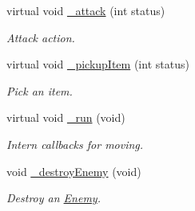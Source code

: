 \begin{DoxyCompactItemize}
virtual void \hyperlink{class_characters_a9ff6c76cd02e53019e15801e9c76a719}{\+\_\+attack} (int status)
\begin{DoxyCompactList}\small\item\em Attack action. \end{DoxyCompactList}\item 
virtual void \hyperlink{class_characters_aee824830a67177342ae606f959fb0c7a}{\+\_\+pickup\+Item} (int status)
\begin{DoxyCompactList}\small\item\em Pick an item. \end{DoxyCompactList}\item 
virtual void \hyperlink{class_characters_aa59e298bef3e58fc7c82deb86e762200}{\+\_\+run} (void)
\begin{DoxyCompactList}\small\item\em Intern callbacks for moving. \end{DoxyCompactList}\item 
void \hyperlink{class_characters_a98666bfdc74679e0ab605a4f6a89ecb2}{\+\_\+destroy\+Enemy} (void)
\begin{DoxyCompactList}\small\item\em Destroy an \hyperlink{class_enemy}{Enemy}. \end{DoxyCompactList}\end{DoxyCompactItemize}
